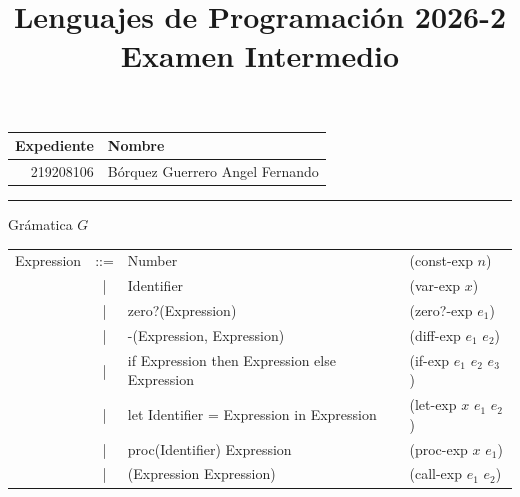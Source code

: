 \documentclass[a4paper, 10pt]{article}
\title
{
    Lenguajes de Programación 2026-2 \\
    Examen Intermedio
}
\begin{document}
\maketitle

\begin{center}
    \begin{tabular}{r|l}
        \textbf{Expediente} & \textbf{Nombre} \\ \hline
        219208106 & Bórquez Guerrero Angel Fernando \\
    \end{tabular}
\end{center}

\rule{\linewidth}{0.3mm}

\vspace{0.3cm}
{\Large Grámatica $G$} \\
\begin{tabular}{rcll}
    Expression & ::= & Number & (const-exp $n$) \\
    & | & Identifier & (var-exp $x$) \\
    & | & zero?(Expression) & (zero?-exp $e_1$) \\
    & | & -(Expression, Expression) & (diff-exp $e_1$ $e_2$) \\
    & | & if Expression then Expression else Expression & (if-exp $e_1$ $e_2$ $e_3$) \\
    & | & let Identifier = Expression in Expression & (let-exp $x$ $e_1$ $e_2$) \\
    & | & proc(Identifier) Expression & (proc-exp $x$ $e_1$) \\
    & | & (Expression Expression) & (call-exp $e_1$ $e_2$) \\
\end{tabular} \\
\end{document}
